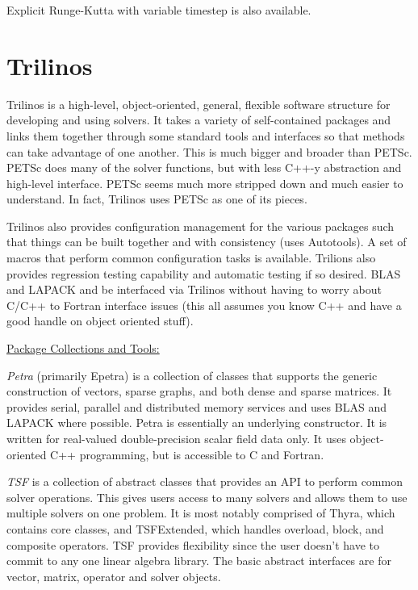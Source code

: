 \documentclass[12pt,twoside]{article}
\begin{document}
Explicit Runge-Kutta with variable timestep is also available.
\section{Trilinos}

Trilinos is  a high-level, object-oriented, general, flexible software structure for developing and using solvers. It takes a variety of self-contained packages and links them together through some standard tools and interfaces so that methods can take advantage of one another. This is much bigger and broader than PETSc. PETSc does many of the solver functions, but with less C++-y abstraction and high-level interface. PETSc seems much more stripped down and much easier to understand. In fact, Trilinos uses PETSc as one of its pieces. 

Trilinos also provides configuration management for the various packages such that things can be built together and with consistency (uses Autotools). A set of macros that perform common configuration tasks is available. Trilions also provides regression testing capability and automatic testing if so desired. BLAS and LAPACK and be interfaced via Trilinos without having to worry about C/C++ to Fortran interface issues (this all assumes you know C++ and have a good handle on object oriented stuff). 

\begin{flushleft}
\underline{Package Collections and Tools:}
\end{flushleft}
\textit{Petra} (primarily Epetra) is a collection of classes that supports the generic construction of vectors, sparse graphs, and both dense and sparse matrices. It provides serial, parallel and distributed memory services and uses BLAS and LAPACK where possible. Petra is essentially an underlying constructor. It is written for real-valued double-precision scalar field data only. It uses object-oriented C++ programming, but is accessible to C and Fortran.

\textit{TSF} is a collection of abstract classes that provides an API to perform common solver operations. This gives users access to many solvers and allows them to use multiple solvers on one problem. It is most notably comprised of Thyra, which contains core classes, and TSFExtended, which handles overload, block, and composite operators. TSF provides flexibility since the user doesn't have to commit to any one linear algebra library. The basic abstract interfaces are for vector, matrix, operator and solver objects.
\end{document}
